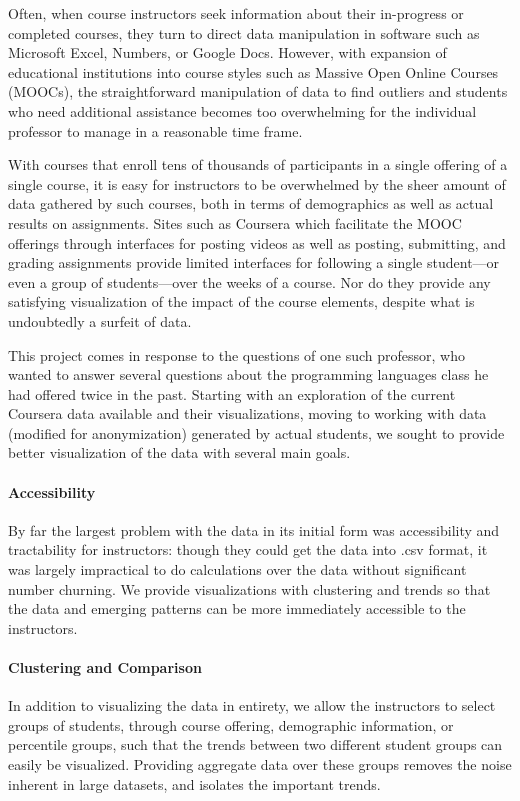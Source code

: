 Often, when course instructors seek information about their in-progress or completed courses, they 
turn to direct data manipulation in software such as Microsoft Excel, Numbers, or Google Docs. However, with expansion of educational institutions into course styles such as Massive Open Online 
Courses (MOOCs), the straightforward manipulation of data to find outliers and students who need 
additional assistance becomes too overwhelming for the individual professor to manage in a 
reasonable time frame. 

With courses that enroll tens of thousands of participants in a single offering of a single 
course, it is easy for instructors to be overwhelmed by the sheer amount of data gathered by such 
courses, both in terms of demographics as well as actual results on assignments. Sites such as 
Coursera \cite{coursers} which facilitate the MOOC offerings through interfaces for posting videos as
well as posting, submitting, and grading assignments provide limited interfaces for following a single student---or even a group of students---over the weeks of a course. Nor do they provide any satisfying visualization of the impact of the course elements, despite what is undoubtedly a surfeit of data. 

This project comes in response to the questions of one such professor, who wanted to answer several questions about the programming languages class he had offered twice in the past. Starting with an exploration of the current Coursera data available and their visualizations, moving to working with data (modified for anonymization) generated by actual students, we sought to provide better visualization of the data with several main goals. 

\paragraph{Accessibility}
By far the largest problem with the data in its initial form was accessibility and tractability for 
instructors: though they could get the data into .csv format, it was largely impractical to do calculations
over the data without significant number churning. We provide visualizations with clustering and 
trends so that the data and emerging patterns can be more immediately accessible to the instructors.

\paragraph{Clustering and Comparison}
In addition to visualizing the data in entirety, we allow the instructors to select groups of students, 
through course offering, demographic information, or percentile groups, such that the trends between 
two different student groups can easily be visualized. Providing aggregate data over these groups removes the noise inherent in large datasets, and isolates the important trends. 

